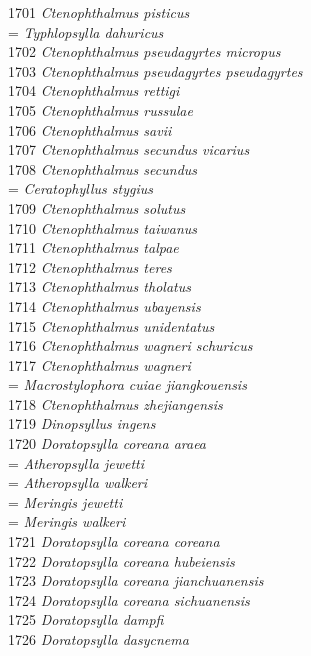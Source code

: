 \documentclass[
]{article}
\begin{document}
1701 \emph{Ctenophthalmus pisticus}\\
= \emph{Typhlopsylla dahuricus}\\
1702 \emph{Ctenophthalmus pseudagyrtes micropus}\\
1703 \emph{Ctenophthalmus pseudagyrtes pseudagyrtes}\\
1704 \emph{Ctenophthalmus rettigi}\\
1705 \emph{Ctenophthalmus russulae}\\
1706 \emph{Ctenophthalmus savii}\\
1707 \emph{Ctenophthalmus secundus vicarius}\\
1708 \emph{Ctenophthalmus secundus}\\
= \emph{Ceratophyllus stygius}\\
1709 \emph{Ctenophthalmus solutus}\\
1710 \emph{Ctenophthalmus taiwanus}\\
1711 \emph{Ctenophthalmus talpae}\\
1712 \emph{Ctenophthalmus teres}\\
1713 \emph{Ctenophthalmus tholatus}\\
1714 \emph{Ctenophthalmus ubayensis}\\
1715 \emph{Ctenophthalmus unidentatus}\\
1716 \emph{Ctenophthalmus wagneri schuricus}\\
1717 \emph{Ctenophthalmus wagneri}\\
= \emph{Macrostylophora cuiae jiangkouensis}\\
1718 \emph{Ctenophthalmus zhejiangensis}\\
1719 \emph{Dinopsyllus ingens}\\
1720 \emph{Doratopsylla coreana araea}\\
= \emph{Atheropsylla jewetti}\\
= \emph{Atheropsylla walkeri}\\
= \emph{Meringis jewetti}\\
= \emph{Meringis walkeri}\\
1721 \emph{Doratopsylla coreana coreana}\\
1722 \emph{Doratopsylla coreana hubeiensis}\\
1723 \emph{Doratopsylla coreana jianchuanensis}\\
1724 \emph{Doratopsylla coreana sichuanensis}\\
1725 \emph{Doratopsylla dampfi}\\
1726 \emph{Doratopsylla dasycnema}\\
\end{document}
